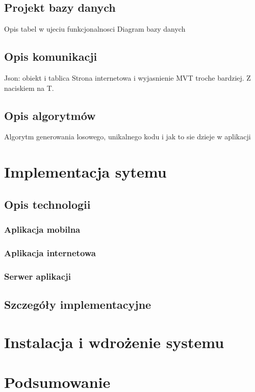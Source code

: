 \documentclass[10pt,titlepage]{article}
\begin{document}
\subsection{Projekt bazy danych}
Opis tabel w ujeciu funkcjonalnosci
Diagram bazy danych
\subsection{Opis komunikacji}
Json: obiekt i tablica
Strona internetowa i wyjasnienie MVT troche bardziej. Z naciskiem na T.
\subsection{Opis algorytmów}
Algorytm generowania losowego, unikalnego kodu i jak to sie dzieje w aplikacji
\newpage
\section{Implementacja sytemu}

\subsection{Opis technologii}
\subsubsection{Aplikacja mobilna}
\subsubsection{Aplikacja internetowa}
\subsubsection{Serwer aplikacji}
\subsection{Szczegóły implementacyjne}

\newpage
\section{Instalacja i wdrożenie systemu}

\newpage
\section*{Podsumowanie}

\newpage
{}



\end{document}
